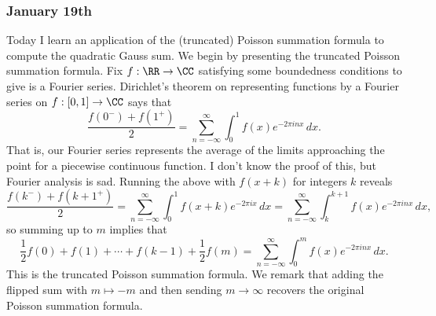 \subsubsection{January 19th}
Today I learn an application of the (truncated) Poisson summation formula to compute the quadratic Gauss sum. We begin by presenting the truncated Poisson summation formula. Fix $f:\RR\to\CC$ satisfying some boundedness conditions to give is a Fourier series. Dirichlet's theorem on representing functions by a Fourier series on $f:[0,1]\to\CC$ says that
\[\frac{f(0^-)+f(1^+)}2=\sum_{n=-\infty}^\infty\int_0^1f(x)e^{-2\pi inx}\,dx.\]
That is, our Fourier series represents the average of the limits approaching the point for a piecewise continuous function. I don't know the proof of this, but Fourier analysis is sad. Running the above with $f(x+k)$ for integers $k$ reveals
\[\frac{f(k^-)+f(k+1^+)}2=\sum_{n=-\infty}^\infty\int_0^1f(x+k)e^{-2\pi ix}\,dx=\sum_{n=-\infty}^\infty\int_k^{k+1}f(x)e^{-2\pi inx}\,dx,\]
so summing up to $m$ implies that
\[\frac12f(0)+f(1)+\cdots+f(k-1)+\frac12f(m)=\sum_{n=-\infty}^\infty\int_0^mf(x)e^{-2\pi inx}\,dx.\]
This is the truncated Poisson summation formula. We remark that adding the flipped sum with $m\mapsto-m$ and then sending $m\to\infty$ recovers the original Poisson summation formula.

